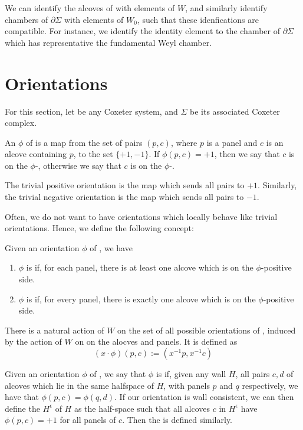 \documentclass[11pt]{article}
\begin{document}
We can identify the alcoves of \sg with elements of $W$, and similarly identify chambers of $\partial\Sigma$ with elements of $W_0$, such that these idenfications are compatible. For instance, we identify the identity element to the chamber of $\partial\Sigma$ which has representative the fundamental Weyl chamber. 


\section{Orientations}

For this section, let \W be any Coxeter system, and $\Sigma$ be its associated Coxeter complex.

\begin{definition}
    An  $\phi$ of \sg is a map from the set of pairs $(p,c)$, where $p$ is a panel and $c$ is an alcove containing $p$, to the set $\{+1,-1\}$. If $\phi (p,c)=+1$, then we say that $c$ is on the $\phi$-, otherwise we say that $c$ is on the $\phi$-. 
\end{definition}


\begin{example}
    The trivial positive orientation is the map which sends all pairs to $+1$. Similarly, the trivial negative orientation is the map which sends all pairs to $-1$. 
\end{example}

Often, we do not want to have orientations which locally behave like trivial orientations. Hence, we define the following concept:

\begin{definition}
    Given an orientation $\phi$ of \sg, we have
    \begin{enumerate}
        \item $\phi$ is  if, for each panel, there is at least one alcove which is on the $\phi$-positive side.
        \item $\phi$ is  if, for every panel, there is exactly one alcove which is on the $\phi$-positive side.
    \end{enumerate}
\end{definition}


There is a natural action of $W$ on the set of all possible orientations of \sg, induced by the action of $W$ on on the alocves and panels. It is defined as 
\[(x\cdot\phi)(p,c):=(x^{-1}p,x^{-1}c)\]

\begin{definition}
    Given an orientation $\phi$ of \sg, we say that $\phi$ is  if, given any wall $H$, all pairs $c,d$ of alcoves which lie in the same halfspace of $H$, with panels $p$ and $q$ respectively, we have that $\phi(p,c)=\phi(q,d)$. If our orientation is wall consistent, we can then define the  $H^{\epsilon}$ of $H$ as the half-space such that all alcoves $c$ in $H^{\epsilon}$ have $\phi(p,c)=+1$ for all panels of $c$. Then the  is defined similarly.
\end{definition}
\end{document}
